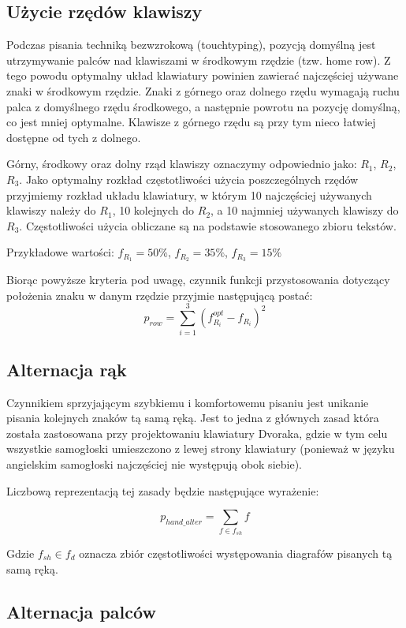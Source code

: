 \documentclass[brudnopis]{xmgr}
\begin{document}
\subsection{Użycie rzędów klawiszy}

Podczas pisania techniką bezwzrokową (touchtyping), pozycją domyślną jest utrzymywanie palców nad klawiszami w środkowym rzędzie (tzw. home row). Z tego powodu optymalny układ klawiatury powinien zawierać najczęściej używane znaki w środkowym rzędzie. Znaki z górnego oraz dolnego rzędu wymagają ruchu palca z domyślnego rzędu środkowego, a następnie powrotu na pozycję domyślną, co jest mniej optymalne. Klawisze z górnego rzędu są przy tym nieco łatwiej dostępne od tych z dolnego.

Górny, środkowy oraz dolny rząd klawiszy oznaczymy odpowiednio jako: $R_1$, $R_2$, $R_3$. Jako optymalny rozkład częstotliwości użycia poszczególnych rzędów przyjmiemy rozkład układu klawiatury, w którym 10 najczęściej używanych klawiszy należy do $R_1$, 10 kolejnych do $R_2$, a 10 najmniej używanych klawiszy do $R_3$. Częstotliwości użycia obliczane są na podstawie stosowanego zbioru tekstów.

Przykładowe wartości: $f_{R_1} = 50\%$, $f_{R_2} = 35\%$, $f_{R_3} = 15\%$

Biorąc powyższe kryteria pod uwagę, czynnik funkcji przystosowania dotyczący położenia znaku w danym rzędzie przyjmie następującą postać:
$$ p_{row} = \sum\limits_{i = 1}^{3} (f_{R_i}^{opt} - f_{R_i})^2 $$


\subsection{Alternacja rąk}

Czynnikiem sprzyjającym szybkiemu i komfortowemu pisaniu jest unikanie pisania kolejnych znaków tą samą ręką. Jest to jedna z głównych zasad która została zastosowana przy projektowaniu klawiatury Dvoraka, gdzie w tym celu wszystkie samogłoski umieszczono z lewej strony klawiatury (ponieważ w języku angielskim samogłoski najczęściej nie występują obok siebie).

Liczbową reprezentacją tej zasady będzie następujące wyrażenie:

$$ p_{hand\_alter} = \sum\limits_{f \in f_{sh}} f $$

Gdzie $ f_{sh} \in f_d $ oznacza zbiór częstotliwości występowania diagrafów pisanych tą samą ręką.


\subsection{Alternacja palców}
\end{document}
